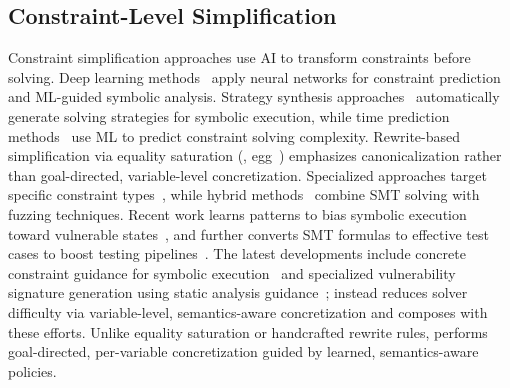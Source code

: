 \subsection{Constraint-Level Simplification}
Constraint simplification approaches use AI to transform constraints before solving. Deep learning methods~\cite{wenConstraintSolvingDeep2020, yangExploringStrategiesGuiding2024} apply neural networks for constraint prediction and ML-guided symbolic analysis. Strategy synthesis approaches~\cite{chen2021synthesize} automatically generate solving strategies for symbolic execution, while time prediction methods~\cite{luoBoostingSymbolicExecutionTime2021, thobenTimeoutPredictionSoftware2023} use ML to predict constraint solving complexity. Rewrite-based simplification via equality saturation (\eg, egg~\cite{willsey2021egg}) emphasizes canonicalization rather than goal-directed, variable-level concretization. Specialized approaches target specific constraint types~\cite{shuaiTypeIntervalAware2021, liuOptimalRefinementbasedArray2022}, while hybrid methods~\cite{muduliSatisfiabilityModuloFuzzing2022} combine SMT solving with fuzzing techniques. Recent work learns patterns to bias symbolic execution toward vulnerable states~\cite{ruaro2021syml}, and further converts SMT formulas to effective test cases to boost testing pipelines~\cite{zhang2024smt2test}. The latest developments include concrete constraint guidance for symbolic execution~\cite{concrete2024icse} and specialized vulnerability signature generation using static analysis guidance~\cite{zhang2024stase}; \tool instead reduces solver difficulty via variable-level, semantics-aware concretization and composes with these efforts. Unlike equality saturation or handcrafted rewrite rules, \tool performs goal-directed, per-variable concretization guided by learned, semantics-aware policies.

